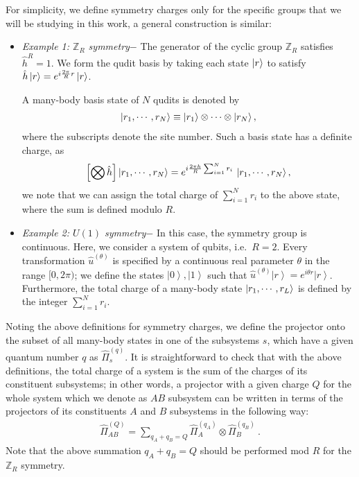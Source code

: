 \documentclass[aps,pra,reprint,superscriptaddress,twocolumn,notitlepage]{revtex4-1}
\numberwithin{equation}{section}
\begin{document}
For simplicity, we define symmetry charges only for the specific groups that we will be studying in this work, a general construction is similar:
\begin{itemize}
    \item 
\emph{Example 1: $\mathbb{Z}_R$ symmetry$-$}
%
The generator of the cyclic group $\mathbb{Z}_R$ satisfies $ \hat h^R = 1$. 
We form the qudit basis by taking each state $\ket{r}$ to satisfy $ \hat h \ket{r} = e^{i\frac{2\pi }{R} r} \ket{r}$.

A many-body basis state of $N$ qudits is denoted by
\begin{align}
\ket{r_1,\cdots, r_N} \equiv \ket{r_1}\otimes\cdots\otimes \ket{r_N},
\end{align}
where the subscripts denote the site number. Such a basis state has a definite charge, as
\begin{align}
\left[\bigotimes\hat{h}\right] \ket{r_1, \cdots, r_N} = e^{i\frac{2\pi h}{R}\sum_{i=1}^N r_i }\, \ket{r_1, \cdots, r_N},
\end{align}
we note that we can assign the total charge of $\sum_{i=1}^N r_i $ to the above state, where the sum is defined modulo $R$.

\item
\emph{Example 2: $U(1)$ symmetry$-$}
%
In this case, the symmetry group is continuous. Here, we consider a system of qubits, i.e.~$R=2$.
Every transformation $\hat{u}^{(\theta)}$ is specified by a continuous real parameter $\theta$ in the range $[0,2\pi)$; we define the states $\left|0 \right\rangle , \left|1 \right\rangle$ such that $\hat{u}^{(\theta)} \left| r \right\rangle = e^{i\theta r} \left| r \right\rangle$.
Furthermore, the total charge of a many-body state $\ket{r_1, \cdots, r_L}$ is defined by the integer $\sum_{i=1}^N r_i$. 

\end{itemize}

Noting the above definitions for symmetry charges, we define the projector onto the subset of all many-body states in one of the subsystems $s$, which have a given quantum number $q$ as $\hat{\Pi}^{(q)}_s$.
It is straightforward to check that with the above definitions, the total charge of a system is the sum of the charges of its constituent subsystems; in other words, a projector with a given charge $Q$ for the whole system which we denote as $AB$ subsystem can be written in terms of the projectors of its constituents $A$ and $B$ subsystems in the following way:
\begin{align}\label{eq:additivity}
\hat \Pi^{(Q)}_{AB}= \sum_{
                  q_A+q_B=Q } \hat \Pi^{(q_A)}_{A}\otimes \hat \Pi^{(q_B)}_{B}\ . 
\end{align}
Note that the above summation $q_A+q_B=Q$ should be performed mod $R$ for the $\mathbb{Z}_R$ symmetry.
\end{document}
